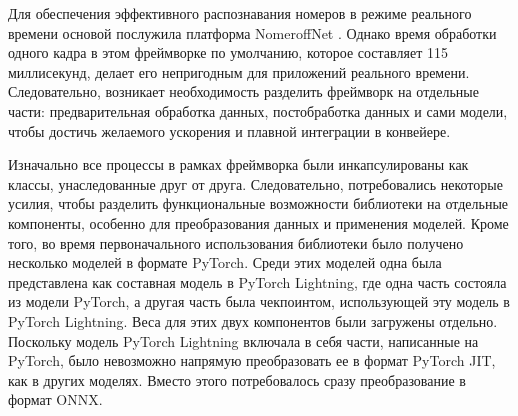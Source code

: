 


Для обеспечения эффективного распознавания номеров в режиме реального времени основой послужила платформа NomeroffNet \cite{Nomeroffnet}. Однако время обработки одного кадра в этом фреймворке по умолчанию, которое составляет 115 миллисекунд, делает его непригодным для приложений реального времени. Следовательно, возникает необходимость разделить фреймворк на отдельные части: предварительная обработка данных, постобработка данных и сами модели, чтобы достичь желаемого ускорения и плавной интеграции в конвейере.

Изначально все процессы в рамках фреймворка были инкапсулированы как классы, унаследованные друг от друга. Следовательно, потребовались некоторые усилия, чтобы разделить функциональные возможности библиотеки на отдельные компоненты, особенно для преобразования данных и применения моделей. Кроме того, во время первоначального использования библиотеки было получено несколько моделей в формате PyTorch. Среди этих моделей одна была представлена как составная модель в PyTorch Lightning, где одна часть состояла из модели PyTorch, а другая часть была чекпоинтом, использующей эту модель в PyTorch Lightning. Веса для этих двух компонентов были загружены отдельно. Поскольку модель PyTorch Lightning включала в себя части, написанные на PyTorch, было невозможно напрямую преобразовать ее в формат PyTorch JIT, как в других моделях. Вместо этого потребовалось сразу преобразование в формат ONNX.

